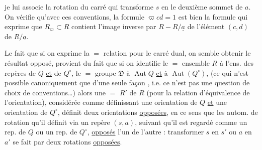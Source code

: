 je lui associe la rotation du carré qui transforme $s$ en le deuxième sommet
de $a$. On vérifie qu'avec ces conventions, la formule $\varpi cd=1$
est bien la formule qui exprime que $R_{\varpi}\subset R$ contient l'image
inverse par $R\mathbin{-}R/\underline{a}$ de l'élément $(c,d)$ de
$R/\underline{a}$.

Le fait que si on exprime la $=$ relation pour le carré dual, on semble
obtenir le résultat opposé, provient du fait que si on identifie le $=$
ensemble $R$ à l'ens. des repères de $Q$ \uline{et} de $Q^\circ$,
 le $=$ groupe $\mathfrak{D}$ à
$\operatorname{Aut}Q$ \uline{et} à $\operatorname{Aut}(Q^\circ)$,
(ce qui n'est possible canoniquement que d'une seule façon
, i.e. ce n'est pas une question de choix de
conventions\ldots) alors une $=$  $R'$ de $R$
 (pour la relation d'équivalence de l'orientation),
considérée comme définissant une orientation de $Q$ \uline{et} une orientation
de $Q^\circ$, définit deux orientations \uline{opposées}, en ce sens que
les autom. de rotation qu'il définit via un repère $(s,a)$, suivant qu'il est
regardé comme un rep. de $Q$ ou un rep. de $Q^\circ$,
 \uline{opposés} l'un de l'autre : transformer $s$ en $s'$ ou
$a$ en $a'$ se fait par deux rotations \uline{opposées}.

